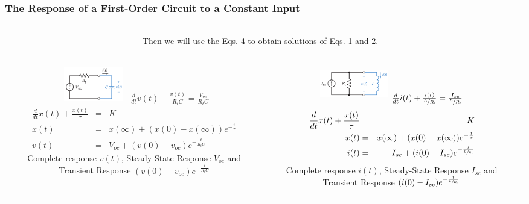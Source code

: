 \documentclass[aspectratio=169]{beamer}
\begin{document}
\begin{frame}[fragile]
	\frametitle{The Response of a First-Order Circuit to a Constant Input}

		\begin{tabular}{cc}
				\begin{columns}
				\begin{column}{1\textwidth}  %
\scriptsize Then we will use the Eqs. 4 to obtain solutions of Eqs. 1 and 2.
				\end{column}
			\end{columns}\\	
				\begin{columns}
				\begin{column}{.5\textwidth}  %
			\center			  \includegraphics[width=3cm,height=1.5cm]{figure7.png}
		\scriptsize	 $\frac{d}{dt}v(t)+\frac{v(t)}{R_tC}=\frac{V_{oc}}{R_tC}$ 
\scriptsize	\begin{eqnarray}
	\nonumber	  \frac{d}{dt}x(t)+\frac{x(t)}{\tau}&=&K \\ \nonumber
			 x(t)&=&x(\infty)+(x(0)-x(\infty)) e^{-\frac{t}{\tau}} \\ \nonumber
			  v(t)&=&V_{oc}+(v(0)-v_{oc}) e^{-\frac{t}{R_tC}}  \nonumber
	\end{eqnarray}
\scriptsize	Complete response $v(t)$, Steady-State  Response $V_{oc}$ and 
Transient Response $(v(0)-v_{oc}) e^{-\frac{t}{R_tC}}$
	
	
				\end{column}
				\begin{column}{.5\textwidth}  %
					\center			  \includegraphics[width=3cm,height=1.5cm]{figure9.png}
			\scriptsize		$\frac{d}{dt}i(t)+\frac{i(t)}{\sfrac{L}{R_t}}=\frac{I_{sc}}{\sfrac{L}{R_t}}$
\scriptsize	\begin{eqnarray}
	\nonumber	  \frac{d}{dt}x(t)+\frac{x(t)}{\tau}&=&K \\ \nonumber
			 x(t)&=&x(\infty)+(x(0)-x(\infty)) e^{-\frac{t}{\tau}} \\ \nonumber
			  i(t)&=&I_{sc}+(i(0)-I_{sc}) e^{-\frac{t}{\sfrac{L}{R_t}}}
	\end{eqnarray}
	\scriptsize	Complete response $i(t)$, Steady-State  Response $I_{sc}$ and 
Transient Response $(i(0)-I_{sc}) e^{-\frac{t}{\sfrac{L}{R_t}}}$
				\end{column}
			\end{columns}\\	

					
\end{tabular}	
	
\end{frame}
\end{document}

